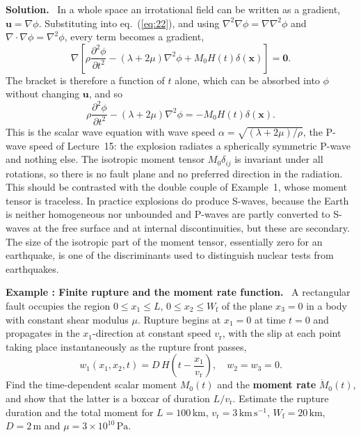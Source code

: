 \documentclass[a4paper,12pt]{paper}
\newcounter{example}
\renewenvironment{example}[1]{%
  \refstepcounter{example}%
  \begin{mdframed}[linewidth=1pt,innertopmargin=6pt,innerbottommargin=6pt]%
  \noindent\textbf{Example \theexample: #1.}\ }{%
  \end{mdframed}}
\newenvironment{solution}{\par\noindent\textbf{Solution.}\ }{\par\medskip}
\begin{document}
\begin{solution}
In a whole space an irrotational field can be written as a gradient,
$\mathbf{u}=\nabla\phi$. Substituting into eq.~(\ref{eq:22}), and using
$\nabla^{2}\nabla\phi=\nabla\nabla^{2}\phi$ and $\nabla\cdot\nabla\phi=\nabla^{2}\phi$,
every term becomes a gradient,
\begin{equation}
\nabla\left[\rho\frac{\partial^{2}\phi}{\partial t^{2}}-(\lambda+2\mu)\nabla^{2}\phi
+M_{0}H(t)\delta(\mathbf{x})\right]=\mathbf{0}.
\label{eq:25}
\end{equation}
The bracket is therefore a function of $t$ alone, which can be absorbed into $\phi$
without changing $\mathbf{u}$, and so
\begin{equation}
\rho\frac{\partial^{2}\phi}{\partial t^{2}}-(\lambda+2\mu)\nabla^{2}\phi=-M_{0}H(t)\delta(\mathbf{x}).
\label{eq:26}
\end{equation}
This is the scalar wave equation with wave speed $\alpha=\sqrt{(\lambda+2\mu)/\rho}$, the
P-wave speed of Lecture~15: the explosion radiates a spherically symmetric P-wave and
nothing else. The isotropic moment tensor $M_{0}\delta_{ij}$ is invariant under all
rotations, so there is no fault plane and no preferred direction in the radiation. This
should be contrasted with the double couple of Example~1, whose moment tensor is
traceless. In practice explosions do produce S-waves, because the Earth is neither
homogeneous nor unbounded and P-waves are partly converted to S-waves at the free surface
and at internal discontinuities, but these are secondary. The size of the isotropic part
of the moment tensor, essentially zero for an earthquake, is one of the discriminants used
to distinguish nuclear tests from earthquakes.
\end{solution}

\begin{example}{Finite rupture and the moment rate function}
A rectangular fault occupies the region $0\le x_{1}\le L$, $0\le x_{2}\le W_{\mathrm{f}}$ of
the plane $x_{3}=0$ in a body with constant shear modulus $\mu$. Rupture begins at
$x_{1}=0$ at time $t=0$ and propagates in the $x_{1}$-direction at constant speed
$v_{\mathrm{r}}$, with the slip at each point taking place instantaneously as the rupture
front passes,
\begin{equation*}
w_{1}(x_{1},x_{2},t)=D\,H\!\left(t-\frac{x_{1}}{v_{\mathrm{r}}}\right),\quad w_{2}=w_{3}=0.
\end{equation*}
Find the time-dependent scalar moment $M_{0}(t)$ and the \textbf{moment rate}
$\dot{M}_{0}(t)$, and show that the latter is a boxcar of duration $L/v_{\mathrm{r}}$.
Estimate the rupture duration and the total moment for $L=100\,\mathrm{km}$,
$v_{\mathrm{r}}=3\,\mathrm{km\,s^{-1}}$, $W_{\mathrm{f}}=20\,\mathrm{km}$, $D=2\,\mathrm{m}$
and $\mu=3\times10^{10}\,\mathrm{Pa}$.
\end{example}
\end{document}

